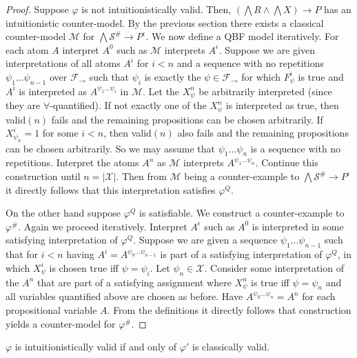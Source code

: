 \documentclass[runningheads]{llncs}
\begin{document}
\begin{proof}
Suppose $\varphi$ is not intuitionistically valid.
Then, $(\bigwedge R\wedge\bigwedge X)\to P$ has an intuitionistic counter-model. By the previous section there exists a classical counter-model $\mathcal M$ for $\bigwedge\mathcal S^\#\to P^\epsilon$.
We now define a QBF model iteratively.
For each atom $A$ interpret $A^0$ such as $\mathcal M$ interprets $A^\epsilon$. Suppose we are given interpretations of all atoms $A^i$ for $i < n$ and a sequence with no repetitions $\psi_1\dots\psi_{n-1}$ over $\mathcal F_\to$ such that $\psi_i$ is exactly the $\psi\in\mathcal F_\to$ for which $F_{\psi}^i$ is true and $A^i$ is interpreted as $A^{\psi_1\dots\psi_i}$  in $\mathcal M$.
Let the $X^{n}_\psi$ be arbitrarily interpreted (since they are $\forall$-quantified). If not exactly one of the $X^{n}_\psi$ is interpreted as true, then valid$(n)$ fails and the remaining propositions can be chosen arbitrarily. If $X^i_{\psi_n} = 1$ for some $i < n$, then valid$(n)$ also fails and the remaining propositions can be chosen arbitrarily.
So we may assume that $\psi_1\dots\psi_n$ is a sequence with no repetitions.
Interpret the atoms $A^n$ as $\mathcal M$ interprets $A^{\psi_1\dots\psi_n}$.
Continue this construction until $n  = |\mathcal X|$. Then from $\mathcal M$ being a counter-example to $\bigwedge\mathcal S^\#\to P^\epsilon$ it directly follows that this interpretation satisfies $\varphi^Q$.
	
	On the other hand suppose $\varphi^Q$ is satisfiable. We construct a counter-example to $\varphi^\#$.
	Again we proceed iteratively. Interpret $A^\epsilon$ such as $A^0$ is interpreted in some satisfying interpretation of $\varphi^Q$. Suppose we are given a sequence $\psi_1\dots \psi_{n-1}$ such that for $i<n$ having $A^i = A^{\psi_0\dots\psi_{n-1}}$ is part of a satisfying interpretation of $\varphi^Q$, in which $X^i_\psi$ is chosen true iff $\psi = \psi_i$. Let $\psi_n\in\mathcal X$. Consider some interpretation of the $A^n$ that are part of a satisfying assignment where $X^n_\psi$ is true iff $\psi = \psi_n$ and all variables quantified above are chosen as before. Have $A^{\psi_0\dots\psi_n} = A^n$ for each propositional variable $A$. From the definitions it directly follows that construction yields a counter-model for $\varphi^\#$.
\end{proof}

\begin{lemma}\label{lemma:fo-simplification}
	$\varphi$ is intuitionistically valid if and only of $\varphi'$ is classically valid.
\end{lemma}
\end{document}
